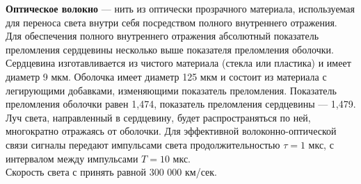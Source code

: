 \textbf{Оптическое волокно} — нить из оптически прозрачного материала, используемая для переноса света  внутри себя посредством полного внутреннего отражения. Для обеспечения полного внутреннего отражения абсолютный показатель преломления сердцевины несколько выше показателя преломления оболочки. Сердцевина изготавливается из чистого материала (стекла или пластика) и имеет диаметр 9 мкм. Оболочка имеет диаметр 125 мкм и состоит из материала с легирующими добавками, изменяющими показатель преломления. Показатель преломления оболочки равен 1,474, показатель преломления сердцевины — 1,479. Луч света, направленный в сердцевину, будет распространяться по ней, многократно отражаясь от оболочки. Для эффективной волоконно-оптической связи сигналы передают импульсами света продолжительностью $\tau = 1$ мкс, с интервалом между импульсами $T = 10$ мкс.\\
Скорость света с принять равной 300 000 км/сек.
